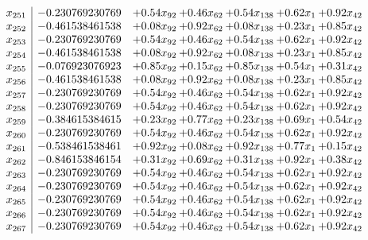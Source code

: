 \documentclass[8pt]{article}
\begin{document}
\[\begin{array}{c| c c@{\hskip 2pt} c@{\hskip 2pt} c@{\hskip 2pt} c@{\hskip 2pt} c@{\hskip 2pt} }
 x_{251}   &  -0.230769230769 & +  0.54 x_{92} & +  0.46 x_{62} & +  0.54 x_{138} & +  0.62 x_{1} & +  0.92 x_{42}\\
 x_{252}   &  -0.461538461538 & +  0.08 x_{92} & +  0.92 x_{62} & +  0.08 x_{138} & +  0.23 x_{1} & +  0.85 x_{42}\\
 x_{253}   &  -0.230769230769 & +  0.54 x_{92} & +  0.46 x_{62} & +  0.54 x_{138} & +  0.62 x_{1} & +  0.92 x_{42}\\
 x_{254}   &  -0.461538461538 & +  0.08 x_{92} & +  0.92 x_{62} & +  0.08 x_{138} & +  0.23 x_{1} & +  0.85 x_{42}\\
 x_{255}   &  -0.076923076923 & +  0.85 x_{92} & +  0.15 x_{62} & +  0.85 x_{138} & +  0.54 x_{1} & +  0.31 x_{42}\\
 x_{256}   &  -0.461538461538 & +  0.08 x_{92} & +  0.92 x_{62} & +  0.08 x_{138} & +  0.23 x_{1} & +  0.85 x_{42}\\
 x_{257}   &  -0.230769230769 & +  0.54 x_{92} & +  0.46 x_{62} & +  0.54 x_{138} & +  0.62 x_{1} & +  0.92 x_{42}\\
 x_{258}   &  -0.230769230769 & +  0.54 x_{92} & +  0.46 x_{62} & +  0.54 x_{138} & +  0.62 x_{1} & +  0.92 x_{42}\\
 x_{259}   &  -0.384615384615 & +  0.23 x_{92} & +  0.77 x_{62} & +  0.23 x_{138} & +  0.69 x_{1} & +  0.54 x_{42}\\
 x_{260}   &  -0.230769230769 & +  0.54 x_{92} & +  0.46 x_{62} & +  0.54 x_{138} & +  0.62 x_{1} & +  0.92 x_{42}\\
 x_{261}   &  -0.538461538461 & +  0.92 x_{92} & +  0.08 x_{62} & +  0.92 x_{138} & +  0.77 x_{1} & +  0.15 x_{42}\\
 x_{262}   &  -0.846153846154 & +  0.31 x_{92} & +  0.69 x_{62} & +  0.31 x_{138} & +  0.92 x_{1} & +  0.38 x_{42}\\
 x_{263}   &  -0.230769230769 & +  0.54 x_{92} & +  0.46 x_{62} & +  0.54 x_{138} & +  0.62 x_{1} & +  0.92 x_{42}\\
 x_{264}   &  -0.230769230769 & +  0.54 x_{92} & +  0.46 x_{62} & +  0.54 x_{138} & +  0.62 x_{1} & +  0.92 x_{42}\\
 x_{265}   &  -0.230769230769 & +  0.54 x_{92} & +  0.46 x_{62} & +  0.54 x_{138} & +  0.62 x_{1} & +  0.92 x_{42}\\
 x_{266}   &  -0.230769230769 & +  0.54 x_{92} & +  0.46 x_{62} & +  0.54 x_{138} & +  0.62 x_{1} & +  0.92 x_{42}\\
 x_{267}   &  -0.230769230769 & +  0.54 x_{92} & +  0.46 x_{62} & +  0.54 x_{138} & +  0.62 x_{1} & +  0.92 x_{42}\\

\end{array}\]
\end{document}
